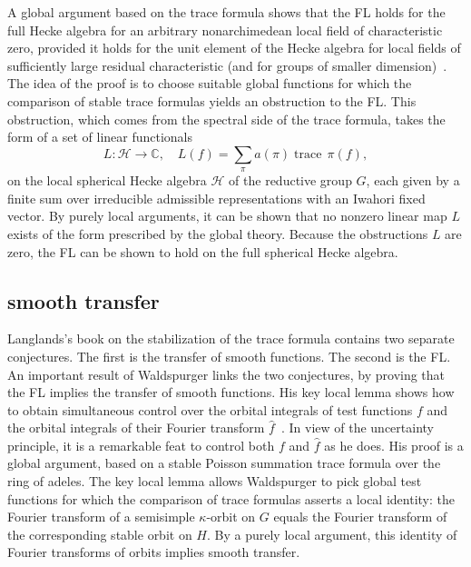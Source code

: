 \documentclass[brochure,english,12pt]{bourbaki}
\def\op#1{{\operatorname{#1}}}
\newcommand{\ring}[1]{\mathbb{#1}}
\begin{document}
 A global argument based on
the trace formula shows that the FL holds for the full
Hecke algebra for an arbitrary nonarchimedean local field of
characteristic zero, provided it holds for the unit element of the
Hecke algebra for local fields of sufficiently large residual
characteristic (and for groups of smaller dimension)~\cite{FLSE}.  
The idea of the proof is to choose suitable global
functions for which the comparison of stable trace formulas yields an
obstruction to the FL.  This obstruction, which comes from the
spectral side of the trace formula, takes the form
of a set of linear functionals  
\[
L:{\mathcal H}\to\ring{C},\quad L(f) = \sum_\pi a(\pi) \op{trace}\,\pi(f),
\]
on the local spherical Hecke
algebra ${\mathcal H}$ of the reductive group $G$, each given by a finite sum over
irreducible admissible representations with an Iwahori fixed vector.
By purely local arguments, it
can be shown that no nonzero linear map $L$ exists of the form
prescribed by the global theory.  
Because the obstructions $L$ are zero,
the FL can be shown to hold on the full spherical Hecke algebra.


\subsection{smooth transfer}

Langlands's book on the stabilization of the trace formula contains
two separate conjectures.  The first is the transfer of smooth
functions.  The second is the FL.  An important result
of Waldspurger links the two conjectures, by proving that the
FL implies the transfer of smooth functions.  
His key local lemma shows how to obtain simultaneous control over the
orbital integrals of test functions $f$ and the orbital integrals of
their Fourier transform $\hat f$~\cite[Prop.~8.2]{XX}.  
In view of the uncertainty principle, it is a remarkable feat to
control both $f$ and $\hat f$ as he does.
His proof is a global argument, based on a stable Poisson summation
trace formula over the ring of adeles.  The key local lemma allows
Waldspurger to pick global test functions for which the comparison of
trace formulas asserts a local identity: the Fourier transform of a
semisimple $\kappa$-orbit on $G$ equals the Fourier transform of the
corresponding stable orbit on $H$.  By a purely local argument, this
identity of Fourier transforms of orbits implies smooth transfer.
\end{document}
